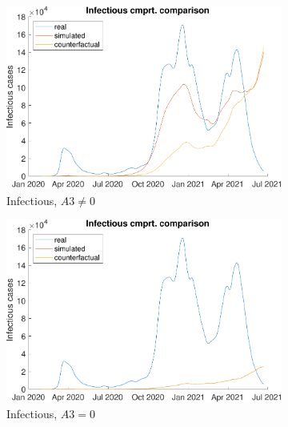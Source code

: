 \begin{figure}[hbtp]
\begin{subfigure}[b]{.45\linewidth}
         \includegraphics[width=\linewidth]{img/210907_171119_combined_wave0/figures/COMP_inf}
         \caption{Infectious, $A3 \neq 0$}
         \label{fig:compAggrCombWave0Inf}
     \end{subfigure}
     \hfill
     \begin{subfigure}[b]{.45\linewidth}
         \centering
         \includegraphics[width=\linewidth]{img/210907_180927_combined_wave0_noa3/figures/COMP_inf}
         \caption{Infectious, $A3 = 0$}
         \label{fig:compAggrCombWave0NoA3Inf}
     \end{subfigure}
     \newline
     \begin{subfigure}[b]{.45\linewidth}
         \centering

\end{subfigure}
\end{figure}
